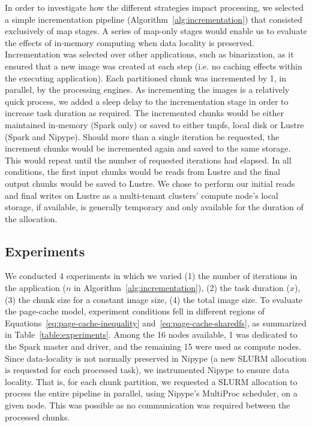 \documentclass{IEEEtran}
\begin{document}
In order to investigate how the different strategies impact processing, we 
selected a simple incrementation pipeline (Algorithm~\ref{alg:incrementation}) 
that consisted exclusively of map 
stages. A series of map-only stages would enable us to evaluate the effects of
in-memory computing when data locality is preserved. Incrementation was 
selected 
over other applications, such as binarization, as it ensured that a new image
was created at each step (i.e. no caching effects within the executing 
application). Each partitioned chunk was incremented by 1, in parallel, by
the processing engines. As incrementing the images is a relatively quick 
process, we added a sleep delay to the incrementation stage in order to 
increase task duration as required. The incremented chunks would be either 
maintained in-memory (Spark only) or saved to either tmpfs, local disk or 
Lustre (Spark and Nipype). Should more than a single iteration be requested, 
the increment chunks would be incremented again and saved to the same storage. 
This would repeat until the number of requested iterations had elapsed. In all 
conditions, the first input chunks would be reads from Lustre and the final 
output chunks would be saved to Lustre. We chose to perform our initial 
reads and final writes on Lustre as a multi-tenant clusters' compute node's 
local storage, if 
available, is generally temporary and only available for the duration of the 
allocation. 

\subsection{Experiments}

We conducted 4 experiments in which we varied (1) the number of 
iterations in the application ($n$ in 
Algorithm~\ref{alg:incrementation}), (2) the task duration ($x$), (3) 
the chunk size for a constant image size, (4) the total image size. To 
evaluate the page-cache model, experiment conditions fell in different 
regions of Equations~\ref{eq:page-cache-inequality} 
and~\ref{eq:page-cache-sharedfs}, as summarized in 
Table~\ref{table:experiments}. Among the 16 nodes available, 1 was 
dedicated to the Spark master and driver, and the remaining 15 were 
used as compute nodes. Since data-locality is not normally preserved in 
Nipype (a new SLURM allocation is requested for each processed task), 
we instrumented Nipype to ensure data locality. That is, for each chunk 
partition, we requested a SLURM allocation to process the entire 
pipeline in parallel, using Nipype's MultiProc scheduler, on a given 
node. This was possible as no communication was required between the 
processed chunks.
\end{document}
